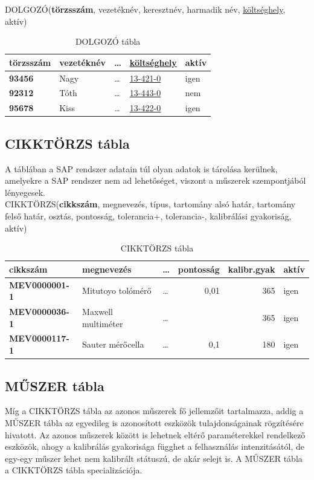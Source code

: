 \documentclass[a4paper,12pt]{report}
\newcommand{\pk}[1]{\textbf{#1}} %
\newcommand{\fk}[1]{\underline{#1}} %
\newcommand{\tabla}[1]{\noindent\MakeUppercase{#1}} %
\begin{document}
\tabla{dolgozó}(\pk{törzsszám}, vezetéknév, keresztnév, harmadik név, 
\fk{költséghely}, aktív)


\begin{table}[ht!]
 \centering
 \begin{footnotesize}
 \begin{tabular}[t]{|l|l|l|l|l|}
  \hline
\textbf{törzsszám}&vezetéknév&\dots&\fk{költséghely}&aktív\\ 
\hline
  \textbf{93456}&Nagy&\dots&\fk{13-421-0}&igen \\
  \textbf{92312}&Tóth&\dots&\fk{13-443-0}&nem \\
  \textbf{95678}&Kiss&\dots&\fk{13-422-0}&igen\\
 \end{tabular}
\end{footnotesize}
\caption{DOLGOZÓ tábla}\label{tabDOLGOZO}
\end{table}


\subsection{CIKKTÖRZS tábla}
A táblában a SAP rendszer adatain túl olyan adatok is tárolása kerülnek, 
amelyekre a SAP rendszer nem ad lehetőséget, viszont a műszerek
szempontjából lényegesek.\\

\tabla{cikktörzs}(\pk{cikkszám}, megnevezés, típus, tartomány alsó határ, tartomány felső határ, osztás, pontosság, tolerancia+, tolerancia-, kalibrálási gyakoriság, aktív)

\begin{table}[ht!]
	\centering
	\begin{footnotesize}
	\begin{tabular}[t]{|l|l|l|r|r|l|}
		\hline
		\textbf{cikkszám}&megnevezés&\dots&pontosság&kalibr.gyak&aktív\\ 
		\hline
		\textbf{MEV0000001-1}&Mitutoyo tolómérő&\dots&0,01&365&igen \\
		\textbf{MEV0000036-1}&Maxwell multiméter&\dots&\,&365&igen \\
		\textbf{MEV0000117-1}&Sauter mérőcella&\dots&0,1&180&igen \\
	\end{tabular}
\end{footnotesize}
	\caption{CIKKTÖRZS tábla}\label{tabCIKKTORZS}
\end{table}

\subsection{MŰSZER tábla}
Míg a \tabla{CIKKTÖRZS} tábla az azonos műszerek fő jellemzőit tartalmazza, addig a \tabla{műszer} tábla az egyedileg is azonosított eszközök tulajdonságainak rögzítésére hivatott.
Az azonos műszerek között is lehetnek eltérő paraméterekkel rendelkező eszközök, ahogy a kalibrálás gyakorisága függhet a felhasználás intenzitásától, de egy-egy műszer lehet nem kalibrált státuszú, de akár selejt is.
A \tabla{MŰSZER} tábla a \tabla{cikktörzs} tábla specializációja.\\
\end{document}

